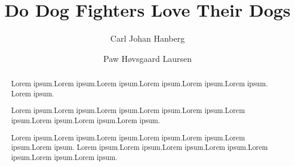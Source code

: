 \documentclass[preprint,12pt, authoryear]{elsarticle}
\begin{document}
\begin{frontmatter}


\title{Do Dog Fighters Love Their Dogs}




\author{Carl Johan Hanberg}
\author{Paw H\o vsgaard Laursen}


\begin{abstract}
Lorem ipsum.Lorem ipsum.Lorem ipsum.Lorem ipsum.Lorem ipsum.Lorem ipsum. Lorem ipsum.

Lorem ipsum.Lorem ipsum.Lorem ipsum.Lorem ipsum.Lorem ipsum.Lorem ipsum.Lorem ipsum.Lorem ipsum.Lorem ipsum.

Lorem ipsum.Lorem ipsum.Lorem ipsum.Lorem ipsum.Lorem ipsum.Lorem ipsum.Lorem ipsum.
Lorem ipsum.Lorem ipsum.Lorem ipsum.Lorem ipsum.Lorem ipsum.Lorem ipsum.Lorem ipsum.

\end{abstract}







\end{frontmatter}

\tableofcontents
\end{document}
